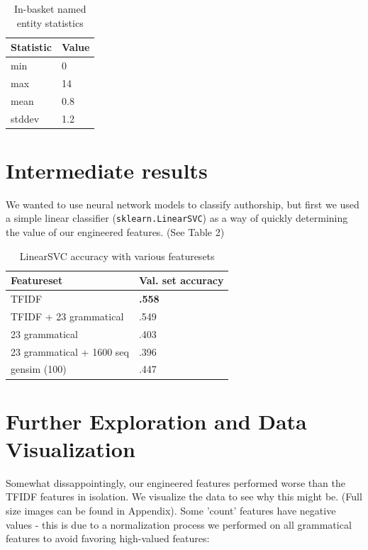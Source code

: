 \documentclass[8pt]{article}
\begin{document}
\begin{table}[h]
  \centering
  \begin{tabular}{|l|l|}
    \hline
    Statistic  & Value \\
    \hline
    min      & 0\\
    max    & 14\\ 
    mean & 0.8 \\    
    stddev    & 1.2 \\  
    \hline
  \end{tabular}
  \caption{In-basket named entity statistics}
  \label{tab:ner}
\end{table}

\section{Intermediate results}
We wanted to use neural network models to classify authorship, but first we used a simple linear classifier (\texttt{sklearn.LinearSVC}) as a way of quickly determining the value of our engineered features. (See Table 2)
\vskip 0.2in
\begin{table}[h]
  \centering
  \begin{tabular}{|l|l|}
    \hline
    Featureset  & Val. set accuracy \\
    \hline
    TFIDF      & \textbf{.558} \\
    TFIDF + 23 grammatical      & .549 \\ 
    23 grammatical      & .403 \\    
    23 grammatical + 1600 seq     & .396 \\  
    gensim (100)      & .447 \\  
    \hline
  \end{tabular}
  \caption{LinearSVC accuracy with various featuresets}
  \label{tab:sparseresults}
\end{table}

\section{Further Exploration and Data Visualization}
Somewhat dissappointingly, our engineered features performed worse than the TFIDF features in isolation. We visualize the data to see why this might be. (Full size images can be found in Appendix). Some 'count' features have negative values - this is due to a normalization process we performed on all grammatical features to avoid favoring high-valued features:
\end{document}
